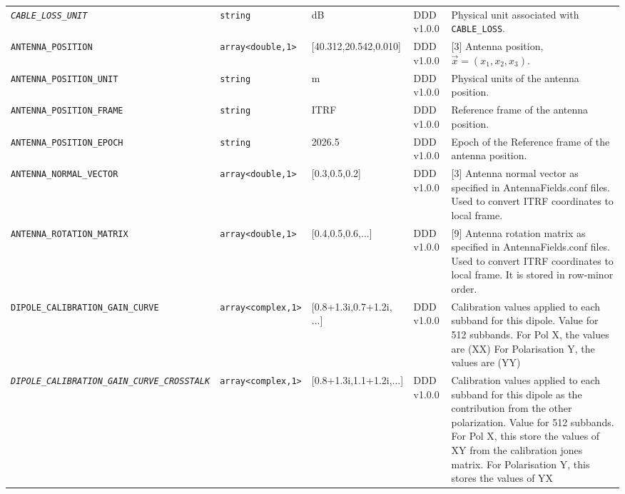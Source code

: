 \documentclass[a4paper,10pt,bibtotoc]{scrartcl}
\begin{document}
\begin{landscape}
\begin{center}
\begin{supertabular}{|llllp{5.25cm}|}
    \small \textit{\texttt{CABLE\_LOSS\_UNIT}} & \verb|string| & dB & DDD v1.0.0 & Physical unit associated with \verb|CABLE_LOSS|. \\
    \small {\texttt{ANTENNA\_POSITION}} & \verb|array<double,1>| & [40.312,20.542,0.010] & DDD v1.0.0 & [3] Antenna position, $\vec x = (x_1,x_2,x_3)$. \\
    \small {\texttt{ANTENNA\_POSITION\_UNIT}} & \verb|string| & m & DDD v1.0.0 & Physical units of the antenna position. \\
    \small {\texttt{ANTENNA\_POSITION\_FRAME}} & \verb|string| & ITRF & DDD v1.0.0 & Reference frame of the antenna position. \\
    \small {\texttt{ANTENNA\_POSITION\_EPOCH}} & \verb|string| & 2026.5 & DDD v1.0.0 & Epoch of the Reference frame of the antenna position. \\
    \small {\texttt{ANTENNA\_NORMAL\_VECTOR}} & \verb|array<double,1>| & [0.3,0.5,0.2] & DDD v1.0.0 & [3] Antenna normal vector as specified in AntennaFields.conf files. Used to convert ITRF coordinates to local frame.\\
    \small {\texttt{ANTENNA\_ROTATION\_MATRIX}} & \verb|array<double,1>| & [0.4,0.5,0.6,...] & DDD v1.0.0 & [9] Antenna rotation matrix as specified in AntennaFields.conf files. Used to convert ITRF coordinates to local frame. It is stored in row-minor order.\\
    \small \texttt{DIPOLE\_CALIBRATION\_GAIN\_CURVE} & \verb|array<complex,1>| & [0.8+1.3i,0.7+1.2i, ...] & DDD v1.0.0& Calibration values applied to each subband for this dipole. Value for 512 subbands. For Pol X, the values are (XX) For Polarisation Y, the values are (YY)\\
    \small \textit{\texttt{DIPOLE\_CALIBRATION\_GAIN\_CURVE\_CROSSTALK}} & \verb|array<complex,1>| &  [0.8+1.3i,1.1+1.2i,...] & DDD v1.0.0& Calibration values applied to each subband for this dipole as the contribution from the other polarization. Value for 512 subbands. For Pol X, this store the values of XY from the calibration jones matrix. For Polarisation Y, this stores the values of YX\\

\end{supertabular}
\end{center}
\end{landscape}
\end{document}
